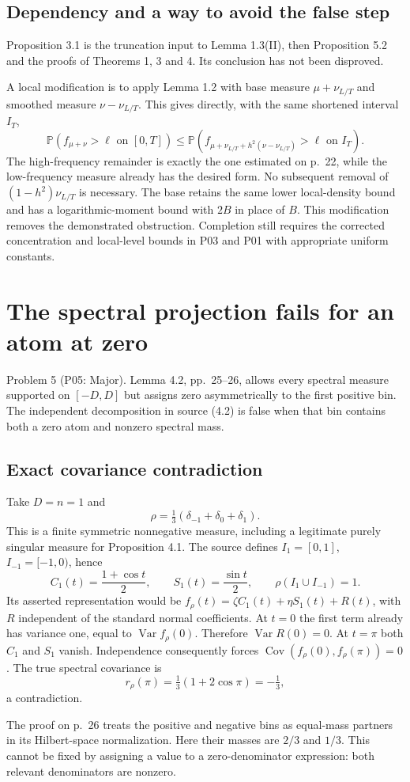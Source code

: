 \documentclass[10pt]{article}
\begin{document}
\subsection*{Dependency and a way to avoid the false step}
Proposition 3.1 is the truncation input to Lemma 1.3(II), then Proposition 5.2 and the proofs of Theorems 1, 3 and 4. Its conclusion has not been disproved.\par
A local modification is to apply Lemma 1.2 with base measure \(\mu+\nu_{L/T}\) and smoothed measure \(\nu-\nu_{L/T}\). This gives directly, with the same shortened interval \(I_T\), \[\mathbb P(f_{\mu+\nu}>\ell\text{ on }[0,T])
 \le
 \mathbb P(f_{\mu+\nu_{L/T}+h^2(\nu-\nu_{L/T})}>\ell
       \text{ on }I_T).\] The high-frequency remainder is exactly the one estimated on p. 22, while the low-frequency measure already has the desired form. No subsequent removal of \((1-h^2)\nu_{L/T}\) is necessary. The base retains the same lower local-density bound and has a logarithmic-moment bound with \(2B\) in place of \(B\). This modification removes the demonstrated obstruction. Completion still requires the corrected concentration and local-level bounds in P03 and P01 with appropriate uniform constants.\par
\section*{The spectral projection fails for an atom at zero}
Problem 5 (P05: Major).  Lemma 4.2, pp. 25–26, allows every spectral measure supported on \([-D,D]\) but assigns zero asymmetrically to the first positive bin. The independent decomposition in source (4.2) is false when that bin contains both a zero atom and nonzero spectral mass.\par
\subsection*{Exact covariance contradiction}
Take \(D=n=1\) and \[\rho=\tfrac13(\delta_{-1}+\delta_0+\delta_1).\] This is a finite symmetric nonnegative measure, including a legitimate purely singular measure for Proposition 4.1. The source defines \(I_1=[0,1]\), \(I_{-1}=[-1,0)\), hence \[C_1(t)=\frac{1+\cos t}{2},\qquad S_1(t)=\frac{\sin t}{2},
 \qquad \rho(I_1\cup I_{-1})=1.\] Its asserted representation would be \(f_\rho(t)=\zeta C_1(t)+\eta S_1(t)+R(t)\), with \(R\) independent of the standard normal coefficients. At \(t=0\) the first term already has variance one, equal to \(\operatorname{Var}f_\rho(0)\). Therefore \(\operatorname{Var}R(0)=0\). At \(t=\pi\) both \(C_1\) and \(S_1\) vanish. Independence consequently forces \(\operatorname{Cov}(f_\rho(0),f_\rho(\pi))=0\). The true spectral covariance is \[r_\rho(\pi)=\tfrac13(1+2\cos\pi)=-\tfrac13,\] a contradiction.\par
The proof on p. 26 treats the positive and negative bins as equal-mass partners in its Hilbert-space normalization. Here their masses are \(2/3\) and \(1/3\). This cannot be fixed by assigning a value to a zero-denominator expression: both relevant denominators are nonzero.\par
\end{document}
